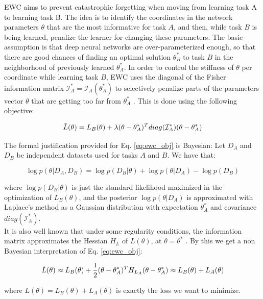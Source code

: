 EWC aims to prevent catastrophic forgetting when moving from learning task A to learning task B. The idea is to identify the coordinates in the network parameters $\theta$ that are the most informative for task $A$, and then, while task $B$ is being learned, penalize the learner for changing these parameters. The basic assumption is that deep neural networks are over-parameterized enough, so that there are good chances of finding an optimal solution $\theta_B^*$ to task $B$ in the neighborhood of previously learned $\theta_A^*$. In order to control the stiffness of $\theta$ per coordinate while learning task $B$, EWC uses the diagonal of the Fisher information matrix $\mathcal{I}_A^*=\mathcal{I}_A(\theta_A^*)$ to selectively penalize parts of the parameters vector $\theta$ that are getting too far from $\theta_A^*$ \cite{kirkpatrick2017overcoming}. This is done using the following objective:

\begin{equation}\label{eq:ewc_obj}
    \Tilde{L}(\theta)=L_B(\theta)+\lambda(\theta-\theta_A^*)^T diag(\mathcal{I}_A^*)(\theta-\theta_A^*)
\end{equation}

The formal justification provided for Eq. \ref{eq:ewc_obj} is Bayesian: Let $D_A$ and $D_B$ be independent datasets used for tasks $A$ and $B$. We have that:

\begin{equation}
    \log p(\theta|D_A,D_B)=\log p(D_B|\theta)+\log p(\theta|D_A)-\log p(D_B)
\end{equation}

where $\log p(D_B|\theta)$ is just the standard likelihood maximized in the optimization of $L_B(\theta)$, and the posterior $\log p(\theta|D_A)$ is approximated with Laplace’s method as a Gaussian distribution with expectation $\theta_A^*$ and covariance $diag(\mathcal{I}_A^*)$. \\ 

It is also well known that under some regularity conditions, the information matrix approximates the Hessian $H_L$ of $L(\theta)$, at $\theta=\theta^*$ \cite{pronzato2013design}. By this we get a non Bayesian interpretation of Eq. \ref{eq:ewc_obj}:

\begin{equation}
    \Tilde{L}(\theta)\approx L_B(\theta)+\frac{1}{2}(\theta-\theta_A^*)^T H_{L_A}(\theta-\theta_A^*)\approx L_B(\theta)+L_A(\theta)
\end{equation}

where $L(\theta)=L_B(\theta)+L_A(\theta)$ is exactly the loss we want to minimize. \\

